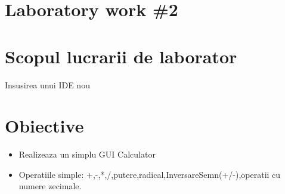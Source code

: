 \section*{Laboratory work \#2}

\section{Scopul lucrarii de laborator}
Insusirea unui IDE nou
\section{Obiective}

\begin{itemize}
	\item Realizeaza un simplu GUI Calculator
\item Operatiile simple: +,-,*,/,putere,radical,InversareSemn(+/-),operatii cu numere zecimale.

\end{itemize}
\clearpage